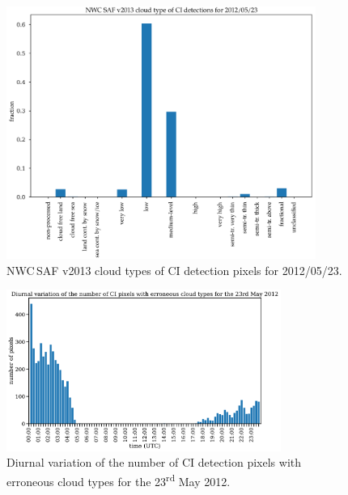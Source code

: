 \begin{figure}
\centering
\includegraphics[width=0.9\textwidth]{Grafiken/Abbildungen/ci_cloud_types.pdf}
\caption{NWC\,SAF v2013 cloud types of CI detection pixels for 2012/05/23.}
\label{fig:ci_cloud_type}
\end{figure}

\begin{figure}
\centering
\includegraphics[width=0.8\textwidth]{Grafiken/Abbildungen/ci_cloud_types_time.pdf}
\caption{Diurnal variation of the number of CI detection pixels with erroneous cloud types for the 23\textsuperscript{rd} May 2012.}
\label{fig:ci_cloud_type_time}
\end{figure}